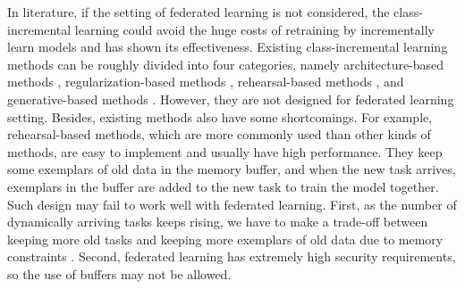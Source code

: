 \documentclass[sigconf,anonymous,review,screen]{acmart}
\begin{document}
%
%



In literature, if the setting of federated learning is not considered, the class-incremental learning could avoid the huge costs of retraining by incrementally learn models \cite{rebuffi2017icarl,aljundi2018memory,aljundi2019gradient,wu2022class,agarwal2022semantics} and has shown its effectiveness. Existing class-incremental learning methods can be roughly divided into four categories, namely architecture-based methods \cite{wu2022class}, regularization-based methods \cite{aljundi2018memory}, rehearsal-based methods \cite{rebuffi2017icarl,aljundi2018memory}, and generative-based methods \cite{agarwal2022semantics}. However, they are not designed for federated learning setting. Besides, existing methods also have some shortcomings. For example, rehearsal-based methods, which are more commonly used than other kinds of methods, are easy to implement and usually have high performance. They keep some exemplars of old data in the memory buffer, and when the new task arrives, exemplars in the buffer are added to the new task to train the model together. Such design may fail to work well with federated learning. First, as the number of dynamically arriving tasks keeps rising, we have to make a trade-off between keeping more old tasks and keeping more exemplars of old data due to memory constraints \cite{dong2022federated}.  Second, federated learning has extremely high security requirements\cite{shokri2015privacy}, so the use of buffers may not be allowed. 
\end{document}

